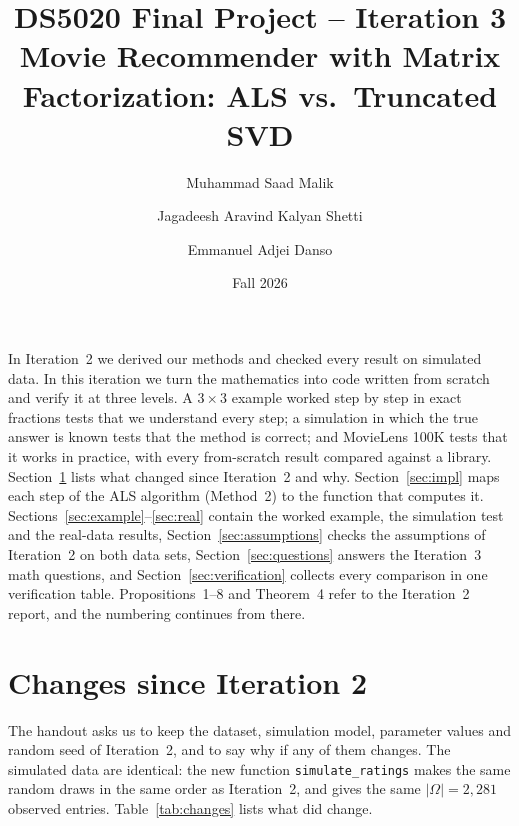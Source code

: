 \documentclass[11pt]{article}
\title{DS5020 Final Project -- Iteration 3\\[4pt]
  \large Movie Recommender with Matrix Factorization: ALS vs.\ Truncated SVD}
\author{Muhammad Saad Malik \and Jagadeesh Aravind Kalyan Shetti \and Emmanuel Adjei Danso}
\date{Fall 2026}
\theoremstyle{definition}
\newcommand{\code}[1]{\texttt{#1}}
\begin{document}
\maketitle

In Iteration~2 we derived our methods and checked every result on simulated data. In this
iteration we turn the mathematics into code written from scratch and verify it at three levels.
A $3\times 3$ example worked step by step in exact fractions tests that we understand every step;
a simulation in which the true answer is known tests that the method is correct; and MovieLens
100K tests that it works in practice, with every from-scratch result compared against a library.
Section~\ref{sec:changes} lists what changed since Iteration~2 and why. Section~\ref{sec:impl}
maps each step of the ALS algorithm (Method~2) to the function that computes it.
Sections~\ref{sec:example}--\ref{sec:real} contain the worked example, the simulation test and
the real-data results, Section~\ref{sec:assumptions} checks the assumptions of Iteration~2 on
both data sets, Section~\ref{sec:questions} answers the Iteration~3 math questions, and
Section~\ref{sec:verification} collects every comparison in one verification table.
Propositions~1--8 and Theorem~4 refer to the Iteration~2 report, and the numbering continues
from there.

\section{Changes since Iteration 2}
\label{sec:changes}

The handout asks us to keep the dataset, simulation model, parameter values and random seed of
Iteration~2, and to say why if any of them changes. The simulated data are identical: the new
function \code{simulate\_ratings} makes the same random draws in the same order as Iteration~2,
and gives the same $|\Omega| = 2{,}281$ observed entries. Table~\ref{tab:changes} lists what did
change.
\end{document}
